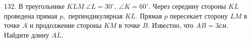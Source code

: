 132. В треугольнике $KLM\ \angle L=30^\circ,\ \angle K=60^\circ.$ Через середину стороны $KL$ проведена прямая $p,$ перпендикулярная $KL.$ Прямая $p$ пересекает сторону $LM$ в точке $A$ и продолжение стороны $KM$ в точке $B.$ Известно, что $AB=3${\it см.} Найдите длину $AL.$\\
